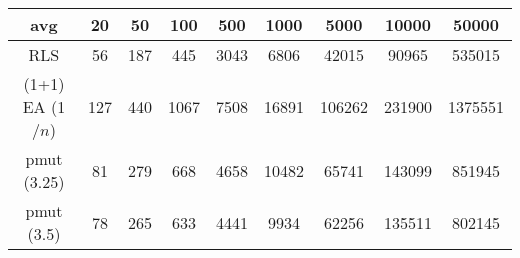 \begin{tabular}[h]{ccccccccc}
avg&20&50&100&500&1000&5000&10000&50000\\\hline
RLS&56&187&445&3043&6806&42015&90965&535015\\
(1+1) EA (1$/n$)&127&440&1067&7508&16891&106262&231900&1375551\\
pmut (3.25)&81&279&668&4658&10482&65741&143099&851945\\
pmut (3.5)&78&265&633&4441&9934&62256&135511&802145\\
\end{tabular}
